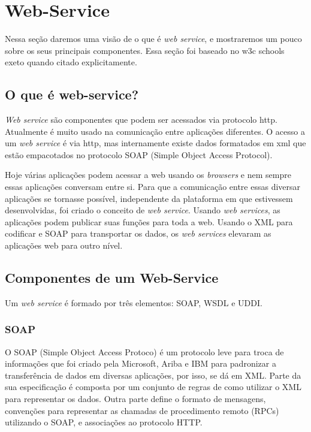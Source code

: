 \section{Web-Service}


Nessa seção daremos uma visão de o que é \textit{web service}, e mostraremos um pouco sobre os seus principais componentes. Essa seção foi baseado no w3c schools ~\cite{w3cs} exeto quando citado explicitamente.

\subsection{O que é web-service?}

\textit{Web service} são componentes que podem ser acessados via protocolo http. Atualmente é muito usado na comunicação entre aplicações diferentes. O acesso a um \textit{web service} é via http, mas internamente existe dados formatados em xml que estão empacotados no protocolo SOAP (Simple Object Access Protocol).

Hoje várias aplicações podem acessar a web usando os \textit{browsers} e nem sempre essas aplicações conversam entre si. Para que a comunicação entre essas diversar aplicações se tornasse possível, independente da plataforma em que estivessem desenvolvidas, foi criado o conceito de \textit{web service}. Usando \textit{web services}, as aplicações podem publicar suas funções para toda a web. Usando o XML para codificar e SOAP para transportar os dados, os \textit{web services} elevaram as aplicações web para outro nível.

\subsection{Componentes de um Web-Service}

Um \textit{web service} é formado por três elementos: SOAP, WSDL e UDDI.

\subsubsection{SOAP}


O SOAP (Simple Object Access Protoco) é um protocolo leve para troca de informações que foi criado pela Microsoft, Ariba e IBM para padronizar a transferência de dados em diversas aplicações, por isso, se dá em XML. Parte da sua especificação é composta por um conjunto de regras de como utilizar o XML para representar os dados. Outra parte define o formato de mensagens, convenções para representar as chamadas de procedimento remoto (RPCs) utilizando o SOAP, e associações ao protocolo HTTP. 

